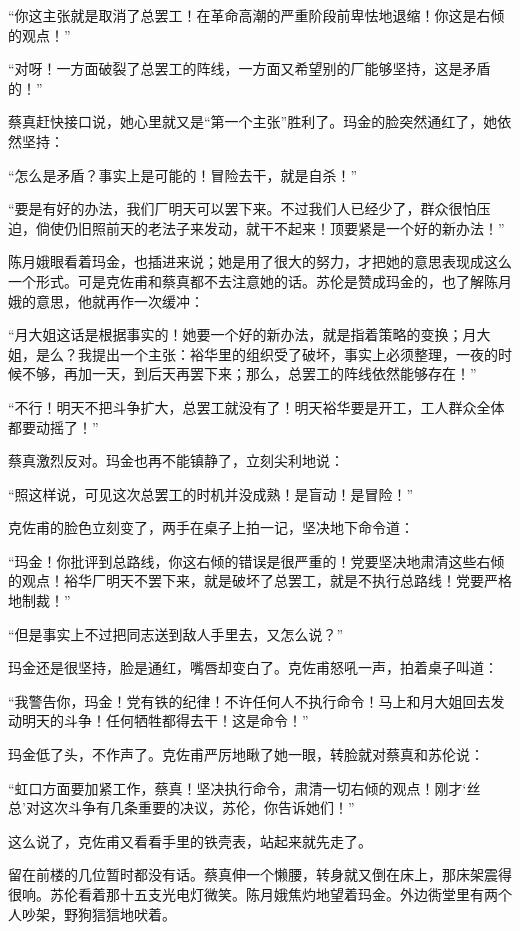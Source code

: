 \par “你这主张就是取消了总罢工！在革命高潮的严重阶段前卑怯地退缩！你这是右倾的观点！”
\par “对呀！一方面破裂了总罢工的阵线，一方面又希望别的厂能够坚持，这是矛盾的！”
\par 蔡真赶快接口说，她心里就又是“第一个主张”胜利了。玛金的脸突然通红了，她依然坚持：
\par “怎么是矛盾？事实上是可能的！冒险去干，就是自杀！”
\par “要是有好的办法，我们厂明天可以罢下来。不过我们人已经少了，群众很怕压迫，倘使仍旧照前天的老法子来发动，就干不起来！顶要紧是一个好的新办法！”
\par 陈月娥眼看着玛金，也插进来说；她是用了很大的努力，才把她的意思表现成这么一个形式。可是克佐甫和蔡真都不去注意她的话。苏伦是赞成玛金的，也了解陈月娥的意思，他就再作一次缓冲：
\par “月大姐这话是根据事实的！她要一个好的新办法，就是指着策略的变换；月大姐，是么？我提出一个主张：裕华里的组织受了破坏，事实上必须整理，一夜的时候不够，再加一天，到后天再罢下来；那么，总罢工的阵线依然能够存在！”
\par “不行！明天不把斗争扩大，总罢工就没有了！明天裕华要是开工，工人群众全体都要动摇了！”
\par 蔡真激烈反对。玛金也再不能镇静了，立刻尖利地说：
\par “照这样说，可见这次总罢工的时机并没成熟！是盲动！是冒险！”
\par 克佐甫的脸色立刻变了，两手在桌子上拍一记，坚决地下命令道：
\par “玛金！你批评到总路线，你这右倾的错误是很严重的！党要坚决地肃清这些右倾的观点！裕华厂明天不罢下来，就是破坏了总罢工，就是不执行总路线！党要严格地制裁！”
\par “但是事实上不过把同志送到敌人手里去，又怎么说？”
\par 玛金还是很坚持，脸是通红，嘴唇却变白了。克佐甫怒吼一声，拍着桌子叫道：
\par “我警告你，玛金！党有铁的纪律！不许任何人不执行命令！马上和月大姐回去发动明天的斗争！任何牺牲都得去干！这是命令！”
\par 玛金低了头，不作声了。克佐甫严厉地瞅了她一眼，转脸就对蔡真和苏伦说：
\par “虹口方面要加紧工作，蔡真！坚决执行命令，肃清一切右倾的观点！刚才‘丝总’对这次斗争有几条重要的决议，苏伦，你告诉她们！”
\par 这么说了，克佐甫又看看手里的铁壳表，站起来就先走了。
\par 留在前楼的几位暂时都没有话。蔡真伸一个懒腰，转身就又倒在床上，那床架震得很响。苏伦看着那十五支光电灯微笑。陈月娥焦灼地望着玛金。外边衖堂里有两个人吵架，野狗狺狺地吠着。
